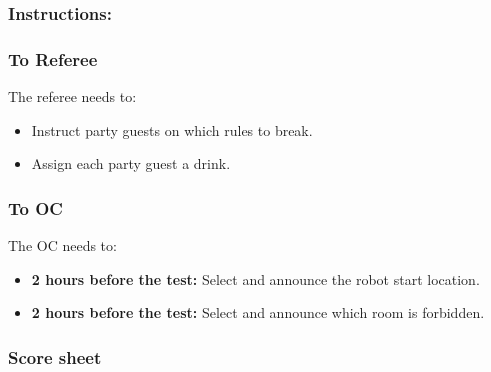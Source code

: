 \subsubsection*{Instructions:}
\subsubsection*{To Referee}

The referee needs to:
\begin{itemize}
	\item Instruct party guests on which rules to break.
	\item Assign each party guest a drink.
\end{itemize}

\subsubsection*{To OC}
The OC needs to:
\begin{itemize}
	\item \textbf{2 hours before the test:} Select and announce the robot start location.
	\item \textbf{2 hours before the test:} Select and announce which room is forbidden.
\end{itemize}

\subsubsection*{Score sheet}
%



